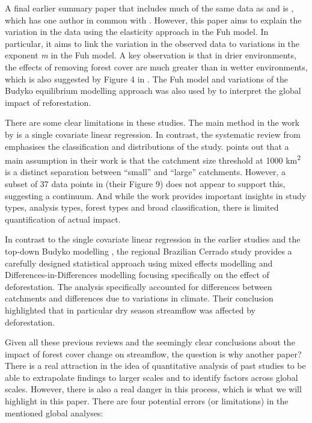 \documentclass[]{elsarticle} %
\begin{document}
A final earlier summary paper that includes much of the same data as \citet{zhang2017} and \citet{filoso2017} is \citet{zhou2015}, which has one author in common with \citet{zhang2017}. However, this paper aims to explain the variation in the data using the elasticity approach in the Fuh model. In particular, it aims to link the variation in the observed data to variations in the exponent \emph{m} in the Fuh model. A key observation is that in drier environments, the effects of removing forest cover are much greater than in wetter environments, which is also suggested by Figure 4 in \citet{zhang2017}. The Fuh model and variations of the Budyko equilibrium modelling approach was also used by \citet{hoekvandijke2022} to interpret the global impact of reforestation.

There are some clear limitations in these studies. The main method in the work by \citet{zhang2017} is a single covariate linear regression. In contrast, the systematic review from \citet{filoso2017} emphasises the classification and distributions of the study. \citet{zhang2017} points out that a main assumption in their work is that the catchment size threshold at 1000 km\textsuperscript{2} is a distinct separation between ``small'' and ``large'' catchments. However, a subset of 37 data points in \citet{filoso2017} (their Figure 9) does not appear to support this, suggesting a continuum. And while the work \citet{filoso2017} provides important insights in study types, analysis types, forest types and broad classification, there is limited quantification of actual impact.

In contrast to the single covariate linear regression in the earlier studies \citep{zhang2017, filoso2017} and the top-down Budyko modelling \citep{zhou2015, hoekvandijke2022}, the regional Brazilian Cerrado study \citep{levy2018} provides a carefully designed statistical approach using mixed effects modelling and Differences-in-Differences modelling focusing specifically on the effect of deforestation. The analysis specifically accounted for differences between catchments and differences due to variations in climate. Their conclusion highlighted that in particular dry season streamflow was affected by deforestation.

Given all these previous reviews and the seemingly clear conclusions about the impact of forest cover change on streamflow, the question is why another paper?
There is a real attraction in the idea of quantitative analysis of past studies to be able to extrapolate findings to larger scales and to identify factors across global scales.
However, there is also a real danger in this process, which is what we will highlight in this paper. There are four potential errors (or limitations) in the mentioned global analyses:
\end{document}
